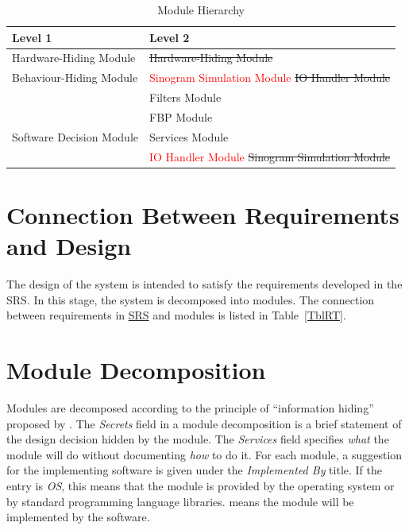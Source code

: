 \documentclass[12pt, titlepage]{article}
\newcommand{\add}{\textcolor{red}}
\begin{document}
\begin{table}[h!]
\centering
\begin{tabular}{p{} p{}}
\toprule
\textbf{Level 1} & \textbf{Level 2}\\
\midrule
{Hardware-Hiding Module} & \st{Hardware-Hiding Module} \\
\midrule

{Behaviour-Hiding Module} & \add{Sinogram Simulation Module} \st{IO Handler Module}\\
& Filters Module\\
& FBP Module\\
\midrule

{Software Decision Module} & Services Module\\
& \add{IO Handler Module} \st{Sinogram Simulation Module}\\
\bottomrule

\end{tabular}
\caption{Module Hierarchy}
\label{TblMH}
\end{table}

\section{Connection Between Requirements and Design} \label{SecConnection}

The design of the system is intended to satisfy the requirements developed in
the SRS. In this stage, the system is decomposed into modules. The connection
between requirements in \href{https://github.com/marischan888/FBP-CT/blob/main/docs/SRS/SRS.pdf}{SRS} and modules is listed in Table~\ref{TblRT}.

\section{Module Decomposition} \label{SecMD}

Modules are decomposed according to the principle of ``information hiding''
proposed by \citet{ParnasEtAl1984}. The \emph{Secrets} field in a module
decomposition is a brief statement of the design decision hidden by the
module. The \emph{Services} field specifies \emph{what} the module will do
without documenting \emph{how} to do it. For each module, a suggestion for the
implementing software is given under the \emph{Implemented By} title. If the
entry is \emph{OS}, this means that the module is provided by the operating
system or by standard programming language libraries.  \emph{\progname{}} means the
module will be implemented by the \progname{} software.
\end{document}
